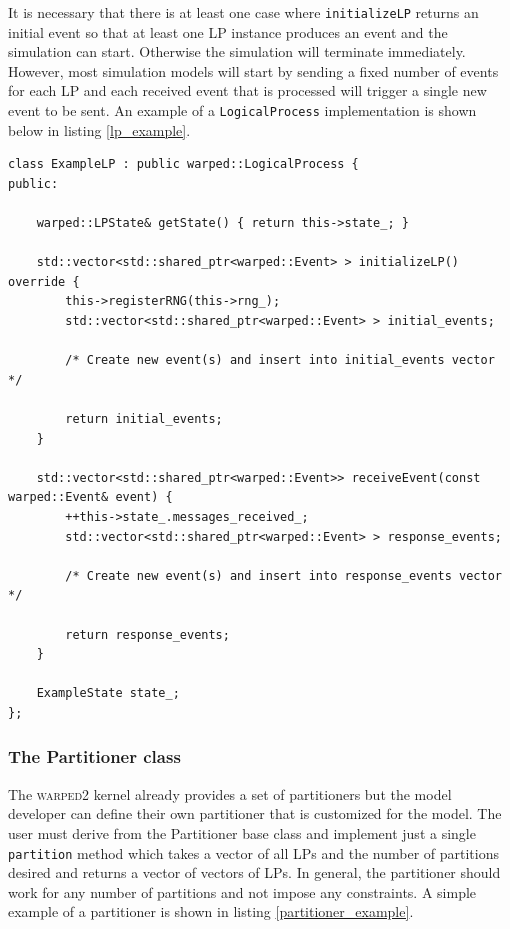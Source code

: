 \documentclass[11pt]{book}
\begin{document}
It is necessary that there is at least one case where \texttt{initializeLP} returns an initial
event so that at least one LP instance produces an event and the simulation can start.
Otherwise the simulation will terminate immediately. However, most simulation models will start
by sending a fixed number of events for each LP and each received event that is processed will
trigger a single new event to be sent. An example of a \texttt{LogicalProcess} implementation
is shown below in listing \ref{lp_example}.

\begin{lstlisting}[caption=Example \textsc{warped2} LogicalProcess Definition, label=lp_example, float]
class ExampleLP : public warped::LogicalProcess {
public:

    warped::LPState& getState() { return this->state_; }

    std::vector<std::shared_ptr<warped::Event> > initializeLP() override {
        this->registerRNG(this->rng_);
        std::vector<std::shared_ptr<warped::Event> > initial_events;

        /* Create new event(s) and insert into initial_events vector */

        return initial_events;
    }

    std::vector<std::shared_ptr<warped::Event>> receiveEvent(const warped::Event& event) {
        ++this->state_.messages_received_;
        std::vector<std::shared_ptr<warped::Event> > response_events;

        /* Create new event(s) and insert into response_events vector */

        return response_events;
    }

    ExampleState state_;
};
\end{lstlisting}

\subsubsection{The Partitioner class}\label{partitioner}

The \textsc{warped2} kernel already provides a set of partitioners but the model developer can define
their own partitioner that is customized for the model.  The user must derive from the Partitioner
base class and implement just a single \texttt{partition} method which takes a vector of all
LPs and the number of partitions desired and returns a vector of vectors of LPs.  In general,
the partitioner should work for any number of partitions and not impose any constraints.
A simple example of a partitioner is shown in listing \ref{partitioner_example}.
\end{document}
